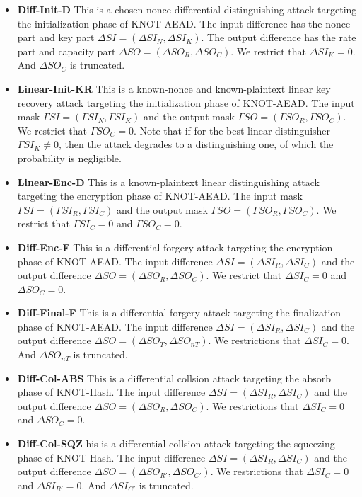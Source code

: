 \begin{itemize}
	\item \textbf{Diff-Init-D} This is a chosen-nonce differential distinguishing attack targeting the initialization phase of KNOT-AEAD. The input difference has the nonce part and key part $\Delta SI=(\Delta SI_N,\Delta SI_K)$. The output difference has the rate part and capacity part $\Delta SO=(\Delta SO_R,\Delta SO_C)$. We restrict that $\Delta SI_K=0$. And $\Delta SO_C$ is truncated. 
	\item \textbf{Linear-Init-KR} This is a known-nonce and known-plaintext linear key recovery attack targeting the initialization phase of KNOT-AEAD. The input mask $\Gamma SI=(\Gamma SI_N,\Gamma SI_K)$ and the output mask $\Gamma SO=(\Gamma SO_R,\Gamma SO_C)$. We restrict that $\Gamma SO_C=0$. Note that if for the best linear distinguisher $\Gamma SI_K\neq 0$, then the attack degrades to a distinguishing one, of which the probability is negligible. 
	\item \textbf{Linear-Enc-D} This is a known-plaintext linear distinguishing attack targeting the encryption phase of KNOT-AEAD. The input mask $\Gamma SI=(\Gamma SI_R,\Gamma SI_C)$ and the output mask $\Gamma SO=(\Gamma SO_R,\Gamma SO_C)$. We restrict that $\Gamma SI_C=0$ and $\Gamma SO_C=0$. 
	\item \textbf{Diff-Enc-F} This is a differential forgery attack targeting the encryption phase of KNOT-AEAD. The input difference $\Delta SI=(\Delta SI_R,\Delta SI_C)$ and the output difference $\Delta SO=(\Delta SO_R,\Delta SO_C)$. We restrict that $\Delta SI_C=0$ and $\Delta SO_C=0$. 
	\item \textbf{Diff-Final-F} This is a differential forgery attack targeting the finalization phase of KNOT-AEAD. The input difference $\Delta SI=(\Delta SI_R,\Delta SI_C)$ and the output difference $\Delta SO=(\Delta SO_T,\Delta SO_{nT})$. We restrictions that $\Delta SI_C=0$. And $\Delta SO_{nT}$ is truncated. 
	\item \textbf{Diff-Col-ABS} This is a differential collsion attack targeting the absorb phase of KNOT-Hash. The input difference $\Delta SI=(\Delta SI_R,\Delta SI_C)$ and the output difference $\Delta SO=(\Delta SO_R,\Delta SO_C)$. We restrictions that $\Delta SI_C=0$ and $\Delta SO_C=0$. 
	\item \textbf{Diff-Col-SQZ} his is a differential collsion attack targeting the squeezing phase of KNOT-Hash. The input difference $\Delta SI=(\Delta SI_R,\Delta SI_C)$ and the output difference $\Delta SO=(\Delta SO_{R'},\Delta SO_{C'})$. We restrictions that $\Delta SI_C=0$ and $\Delta SI_{R'}=0$. And $\Delta SI_{C'}$ is truncated. 
\end{itemize}

